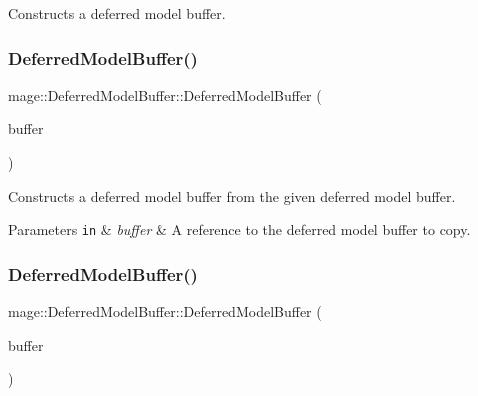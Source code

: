 Constructs a deferred model buffer. \hypertarget{structmage_1_1_deferred_model_buffer_ae90c52678b98c25e2ff966f0b4d79663}{}\label{structmage_1_1_deferred_model_buffer_ae90c52678b98c25e2ff966f0b4d79663} 
\subsubsection{\texorpdfstring{Deferred\+Model\+Buffer()}{DeferredModelBuffer()}\hspace{0.1cm}{\footnotesize\ttfamily [2/3]}}
{\footnotesize\ttfamily mage\+::\+Deferred\+Model\+Buffer\+::\+Deferred\+Model\+Buffer (\begin{DoxyParamCaption}\item[{const \hyperlink{structmage_1_1_deferred_model_buffer}{Deferred\+Model\+Buffer} \&}]{buffer }\end{DoxyParamCaption})\hspace{0.3cm}{\ttfamily [default]}}

Constructs a deferred model buffer from the given deferred model buffer.


\begin{DoxyParams}[1]{Parameters}
\mbox{\tt in}  & {\em buffer} & A reference to the deferred model buffer to copy. \\
\hline
\end{DoxyParams}
\hypertarget{structmage_1_1_deferred_model_buffer_a0545918fe84e92af3d444039845dad63}{}\label{structmage_1_1_deferred_model_buffer_a0545918fe84e92af3d444039845dad63} 
\subsubsection{\texorpdfstring{Deferred\+Model\+Buffer()}{DeferredModelBuffer()}\hspace{0.1cm}{\footnotesize\ttfamily [3/3]}}
{\footnotesize\ttfamily mage\+::\+Deferred\+Model\+Buffer\+::\+Deferred\+Model\+Buffer (\begin{DoxyParamCaption}\item[{\hyperlink{structmage_1_1_deferred_model_buffer}{Deferred\+Model\+Buffer} \&\&}]{buffer }\end{DoxyParamCaption})\hspace{0.3cm}{\ttfamily [default]}}

